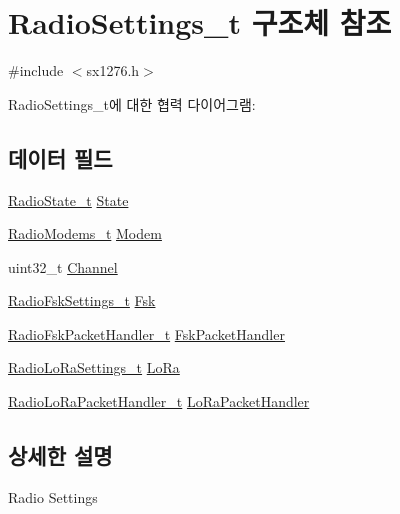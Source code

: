 \hypertarget{struct_radio_settings__t}{}\section{Radio\+Settings\+\_\+t 구조체 참조}
\label{struct_radio_settings__t}


{\ttfamily \#include $<$sx1276.\+h$>$}



Radio\+Settings\+\_\+t에 대한 협력 다이어그램\+:
\subsection*{데이터 필드}
\begin{DoxyCompactItemize}
\item 
\mbox{\hyperlink{radio_8h_a2f3fa4ad0237c4ace94aa99086aac9f5}{Radio\+State\+\_\+t}} \mbox{\hyperlink{struct_radio_settings__t_a7c6fbd4973c8e0d1868c82747d589c3d}{State}}
\item 
\mbox{\hyperlink{radio_8h_a992ef7a5b7f52975ba7bd8dd97740057}{Radio\+Modems\+\_\+t}} \mbox{\hyperlink{struct_radio_settings__t_a3490469594ac68c5d2dea9260e6a1536}{Modem}}
\item 
uint32\+\_\+t \mbox{\hyperlink{struct_radio_settings__t_ae82bf9242a014164f9f6907f29782c44}{Channel}}
\item 
\mbox{\hyperlink{struct_radio_fsk_settings__t}{Radio\+Fsk\+Settings\+\_\+t}} \mbox{\hyperlink{struct_radio_settings__t_a1f8d25186ba3f7d3cb39a541c1cdb1e8}{Fsk}}
\item 
\mbox{\hyperlink{struct_radio_fsk_packet_handler__t}{Radio\+Fsk\+Packet\+Handler\+\_\+t}} \mbox{\hyperlink{struct_radio_settings__t_afc9f5de24be5808af3c3a5275fdd8031}{Fsk\+Packet\+Handler}}
\item 
\mbox{\hyperlink{struct_radio_lo_ra_settings__t}{Radio\+Lo\+Ra\+Settings\+\_\+t}} \mbox{\hyperlink{struct_radio_settings__t_a33cfe7ab9aa28cc24b778d89d7175a57}{Lo\+Ra}}
\item 
\mbox{\hyperlink{struct_radio_lo_ra_packet_handler__t}{Radio\+Lo\+Ra\+Packet\+Handler\+\_\+t}} \mbox{\hyperlink{struct_radio_settings__t_a4d98a38298aaafb08b5fcc86c5e964b8}{Lo\+Ra\+Packet\+Handler}}
\end{DoxyCompactItemize}


\subsection{상세한 설명}
Radio Settings 

